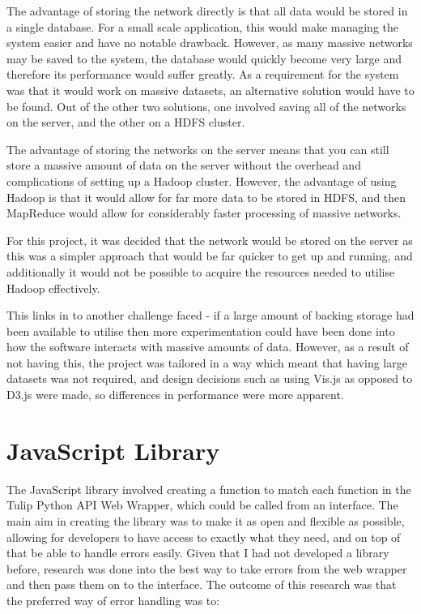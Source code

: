 \documentclass[../dissertation.tex]{subfiles}
\begin{document}
The advantage of storing the network directly is that all data would be stored in a single database. For a small scale application, this would make managing the system easier and have no notable drawback. However, as many massive networks may be saved to the system, the database would quickly become very large and therefore its performance would suffer greatly. As a requirement for the system was that it would work on massive datasets, an alternative solution would have to be found. Out of the other two solutions, one involved saving all of the networks on the server, and the other on a HDFS cluster. 

The advantage of storing the networks on the server means that you can still store a massive amount of data on the server without the overhead and complications of setting up a Hadoop cluster. However, the advantage of using Hadoop is that it would allow for far more data to be stored in HDFS, and then MapReduce would allow for considerably faster processing of massive networks.

For this project, it was decided that the network would be stored on the server as this was a simpler approach that would be far quicker to get up and running, and additionally it would not be possible to acquire the resources needed to utilise Hadoop effectively.

This links in to another challenge faced - if a large amount of backing storage had been available to utilise then more experimentation could have been done into how the software interacts with massive amounts of data. However, as a result of not having this, the project was tailored in a way which meant that having large datasets was not required, and design decisions such as using Vis.js as opposed to D3.js were made, so differences in performance were more apparent.

\section{JavaScript Library}
\label{sec:jslib}

The JavaScript library involved creating a function to match each function in the Tulip Python API Web Wrapper, which could be called from an interface. The main aim in creating the library was to make it as open and flexible as possible, allowing for developers to have access to exactly what they need, and on top of that be able to handle errors easily. Given that I had not developed a library before, research was done into the best way to take errors from the web wrapper and then pass them on to the interface. The outcome of this research was that the preferred way of error handling was to:
\end{document}
